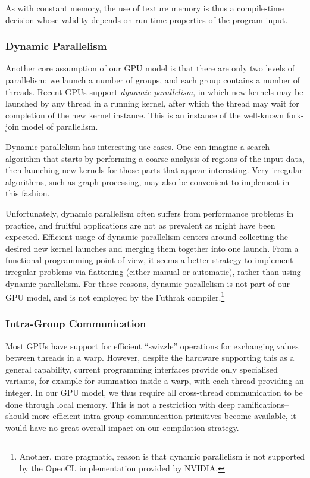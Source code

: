 \begin{description}
  As with constant memory, the use of texture memory is thus a
  compile-time decision whose validity depends on run-time properties
  of the program input.
\end{description}

\subsubsection{Dynamic Parallelism}

Another core assumption of our GPU model is that there are only two
levels of parallelism: we launch a number of groups, and each group
contains a number of threads.  Recent GPUs support \textit{dynamic
  parallelism}, in which new kernels may be launched by any thread in
a running kernel, after which the thread may wait for completion of
the new kernel instance.  This is an instance of the well-known
fork-join model of parallelism.

Dynamic parallelism has interesting use cases.  One can imagine a
search algorithm that starts by performing a coarse analysis of
regions of the input data, then launching new kernels for those parts
that appear interesting.  Very irregular algorithms, such as graph
processing, may also be convenient to implement in this fashion.

Unfortunately, dynamic parallelism often suffers from performance
problems in practice, and fruitful applications
are not as prevalent as might have been expected.  Efficient usage of
dynamic parallelism centers around collecting the desired new kernel
launches and merging them together into one launch.  From a functional
programming point of view, it seems a better strategy to implement
irregular problems via flattening (either manual or automatic), rather
than using dynamic parallelism.  For these reasons, dynamic
parallelism is not part of our GPU model, and is not employed by the
Futhrak compiler.\footnote{Another, more pragmatic, reason is that
  dynamic parallelism is not supported by the OpenCL implementation
  provided by NVIDIA.}

\subsubsection{Intra-Group Communication}

Most GPUs have support for efficient ``swizzle'' operations for
exchanging values between threads in a warp.  However, despite the
hardware supporting this as a general capability, current programming
interfaces provide only specialised variants, for example for
summation inside a warp, with each thread providing an integer.  In
our GPU model, we thus require all cross-thread communication to be
done through local memory.  This is not a restriction with deep
ramifications--should more efficient intra-group communication
primitives become available, it would have no great overall impact on
our compilation strategy.

